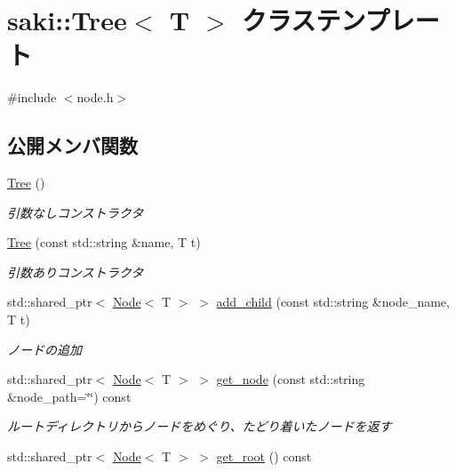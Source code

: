 \hypertarget{classsaki_1_1_tree}{}\section{saki\+:\+:Tree$<$ T $>$ クラステンプレート}
\label{classsaki_1_1_tree}


{\ttfamily \#include $<$node.\+h$>$}

\subsection*{公開メンバ関数}
\begin{DoxyCompactItemize}
\item 
\mbox{\hyperlink{classsaki_1_1_tree_aaf7bba903c917f6ee098e5c02b75b6ec}{Tree}} ()
\begin{DoxyCompactList}\small\item\em 引数なしコンストラクタ \end{DoxyCompactList}\item 
\mbox{\hyperlink{classsaki_1_1_tree_a3b755ca793a3e3c9dd6e0aee77bf7bd6}{Tree}} (const std\+::string \&name, T t)
\begin{DoxyCompactList}\small\item\em 引数ありコンストラクタ \end{DoxyCompactList}\item 
std\+::shared\+\_\+ptr$<$ \mbox{\hyperlink{classsaki_1_1_node}{Node}}$<$ T $>$ $>$ \mbox{\hyperlink{classsaki_1_1_tree_aa0f905a290a69becb68388d7bbfd9e9f}{add\+\_\+child}} (const std\+::string \&node\+\_\+name, T t)
\begin{DoxyCompactList}\small\item\em ノードの追加 \end{DoxyCompactList}\item 
std\+::shared\+\_\+ptr$<$ \mbox{\hyperlink{classsaki_1_1_node}{Node}}$<$ T $>$ $>$ \mbox{\hyperlink{classsaki_1_1_tree_aad47033095b8e210bd2e265f7160e176}{get\+\_\+node}} (const std\+::string \&node\+\_\+path=\char`\"{}\char`\"{}) const
\begin{DoxyCompactList}\small\item\em ルートディレクトリからノードをめぐり、たどり着いたノードを返す \end{DoxyCompactList}\item 
std\+::shared\+\_\+ptr$<$ \mbox{\hyperlink{classsaki_1_1_node}{Node}}$<$ T $>$ $>$ \mbox{\hyperlink{classsaki_1_1_tree_a5ca3a3226e542530008a270ee958d6e1}{get\+\_\+root}} () const

\end{DoxyCompactItemize}
